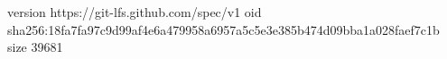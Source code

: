 version https://git-lfs.github.com/spec/v1
oid sha256:18fa7fa97c9d99af4e6a479958a6957a5c5e3e385b474d09bba1a028faef7c1b
size 39681
